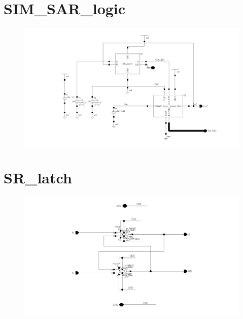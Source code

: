 \documentclass[english, 12pt, a4paper]{ifimaster}
\begin{document}
\begin{appendices}
\section{SIM\_SAR\_logic}
\begin{figure}[!ht]
 \centering
 \includegraphics[width=20cm, angle=90]{img/SIM_sar_logic_gated_2_schem}
 \label{app:SIM:sar:logic}
\end{figure}

\newpage
\section{SR\_latch}
\begin{figure}[!ht]
 \centering
 \includegraphics[width=20cm, angle=90]{img/SR_latch_schem}
 \label{app:sr:latch}
\end{figure}

\newpage

\end{appendices}
\end{document}
